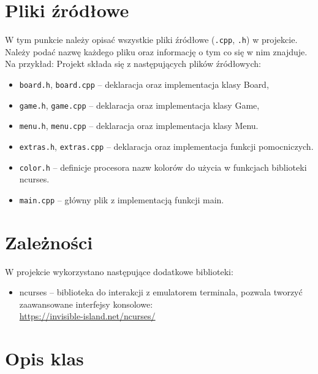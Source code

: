 \documentclass{article}
\begin{document}
\section{Pliki źródłowe}

W tym punkcie należy opisać wszystkie pliki źródłowe (\texttt{.cpp}, \texttt{.h}) w projekcie. Należy podać nazwę każdego pliku oraz informację o tym co się w nim znajduje. Na przykład:
Projekt składa się z następujących plików źródłowych:
    \begin{itemize}
    \item \texttt{board.h}, \texttt{board.cpp} – deklaracja oraz implementacja klasy Board,
    \item \texttt{game.h}, \texttt{game.cpp} – deklaracja oraz implementacja klasy Game,
    \item \texttt{menu.h}, \texttt{menu.cpp} – deklaracja oraz implementacja klasy Menu.
    \item \texttt{extras.h}, \texttt{extras.cpp} – deklaracja oraz implementacja funkcji pomocniczych.
    \item \texttt{color.h} – definicje procesora nazw kolorów do użycia w funkcjach biblioteki ncurses.
    \item \texttt{main.cpp} – główny plik z implementacją funkcji main.
    \end{itemize}

\section{Zależności}

W projekcie wykorzystano następujące dodatkowe biblioteki:
    \begin{itemize}
    \item ncurses – biblioteka do interakcji z emulatorem terminala,  
    pozwala  tworzyć zaawansowane interfejsy konsolowe:\\
    \url{https://invisible-island.net/ncurses/}
    \end{itemize}
\section{Opis klas}
\end{document}
